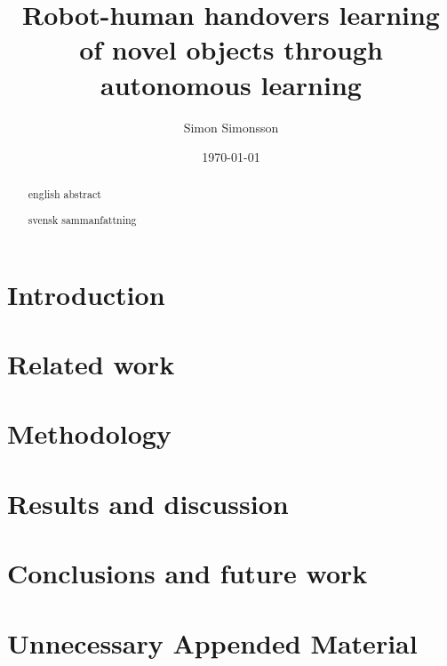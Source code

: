\documentclass{kththesis}
\title{Robot-human handovers learning of novel objects through autonomous learning}
\author{Simon Simonsson}
\date{\today}
\begin{document}
\frontmatter %
\titlepage

\begin{abstract}
	english abstract
\end{abstract}

\begin{otherlanguage}{swedish}
	\begin{abstract}
		svensk sammanfattning
	\end{abstract}
\end{otherlanguage}

\tableofcontents

\mainmatter %

\chapter{Introduction}


\chapter{Related work}


\chapter{Methodology}


\chapter{Results and discussion}


\chapter{Conclusions and future work}


\printbibliography[heading=bibintoc] %

\appendix
\chapter{Unnecessary Appended Material}
\end{document}
